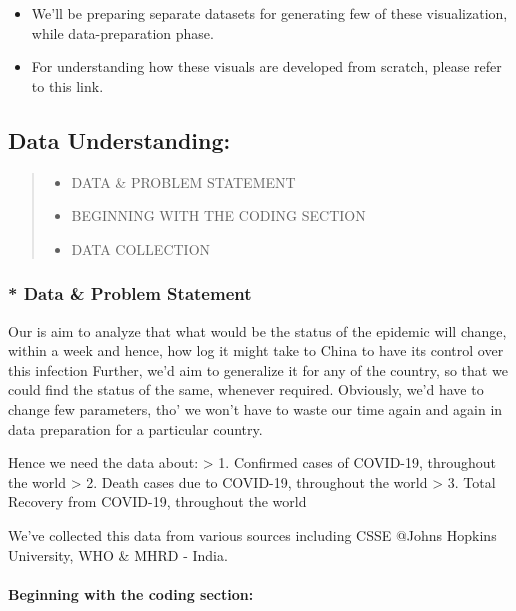 \documentclass[11pt]{article}
\providecommand{\tightlist}{%
      \setlength{\itemsep}{0pt}\setlength{\parskip}{0pt}}
\begin{document}
    \begin{itemize}
\tightlist
\item
  We'll be preparing separate datasets for generating few of these
  visualization, while data-preparation phase.
\item
  For understanding how these visuals are developed from scratch, please
  refer to this link.
\end{itemize}

    

    \hypertarget{data-understanding}{%
\subsection{Data Understanding:}\label{data-understanding}}

\begin{quote}
\begin{itemize}
\tightlist
\item
  DATA \& PROBLEM STATEMENT
\item
  BEGINNING WITH THE CODING SECTION
\item
  DATA COLLECTION
\end{itemize}
\end{quote}

    \hypertarget{data-problem-statement}{%
\subsubsection{* Data \& Problem
Statement}\label{data-problem-statement}}

    Our is aim to analyze that what would be the status of the epidemic will
change, within a week and hence, how log it might take to China to have
its control over this infection Further, we'd aim to generalize it for
any of the country, so that we could find the status of the same,
whenever required. Obviously, we'd have to change few parameters, tho'
we won't have to waste our time again and again in data preparation for
a particular country.

Hence we need the data about: \textgreater{} 1. Confirmed cases of
COVID-19, throughout the world \textgreater{} 2. Death cases due to
COVID-19, throughout the world \textgreater{} 3. Total Recovery from
COVID-19, throughout the world

We've collected this data from various sources including CSSE @Johns
Hopkins University, WHO \& MHRD - India. 

    \hypertarget{beginning-with-the-coding-section}{%
\paragraph{Beginning with the coding
section:}\label{beginning-with-the-coding-section}}
\end{document}
